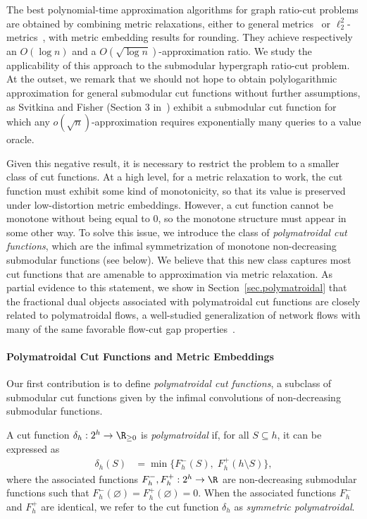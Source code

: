\documentclass[letterpaper]{article}
\begin{document}
The best polynomial-time approximation algorithms for graph ratio-cut problems are obtained by combining metric relaxations, either to general metrics~\cite{leightonMulticommodityMaxflowMincut1999} or $\ell_2^2$-metrics~\cite{ARV2009}, with metric embedding results for rounding. They achieve respectively an $O(\log n)$ and a $O(\sqrt{\log n})$-approximation ratio.
We study the applicability of this approach to the submodular hypergraph ratio-cut problem. At the outset, we remark that we should not hope to obtain polylogarithmic approximation for general submodular cut functions without further assumptions, as Svitkina and Fisher (Section 3 in~\cite{svitkinaSubmodularApproximationSamplingbased2010}) exhibit a submodular cut function for which any $o(\sqrt{n})$-approximation requires exponentially many queries to a value oracle.

Given this negative result, it is necessary to restrict the problem to a smaller class of cut functions.
At a high level, for a metric relaxation to work, the cut function must exhibit some kind of monotonicity, so that its value is preserved under low-distortion metric embeddings. However, a cut function cannot be monotone without being equal to $0$, so the monotone structure must appear in some other way.  To solve this issue, we introduce the class of \emph{polymatroidal cut functions}, which are the infimal symmetrization of monotone non-decreasing submodular functions (see below).
We believe that this new class captures most cut functions that are amenable to approximation via metric relaxation. As partial evidence to this statement, we show in Section~\ref{sec.polymatroidal} that the fractional dual objects associated with polymatroidal cut functions are closely related to polymatroidal flows, a well-studied generalization of network flows with many of the same favorable flow-cut gap properties~\cite{chekuri2012multicommodity}.

\paragraph{Polymatroidal Cut Functions and Metric Embeddings}
 Our first contribution is to define {\it polymatroidal cut functions}, a subclass of submodular cut functions given by the infimal convolutions of non-decreasing submodular functions.

\begin{definition}\label{def.monotone-submodular-cut-function}
A cut function $\delta_h: 2^h \to \R_{\geq 0}$ is {\it polymatroidal} if, for all $S \subseteq h$, it can be expressed as
\begin{align*}
\delta_h(S) & = \min \big\{F^{-}_h(S),\;F^{+}_h(h \setminus S) \big\},  \end{align*}
where the associated functions $F_h^{-},F^{+}_h: 2^h \rightarrow \R$ are non-decreasing submodular functions such that $F^{-}_h(\varnothing) = F^{+}_h(\varnothing)= 0.$ When the associated functions $F^-_h$ and $F^+_h$ are identical, we refer to the cut function $\delta_h$ as  {\it symmetric polymatroidal}.
\end{definition}
\end{document}

